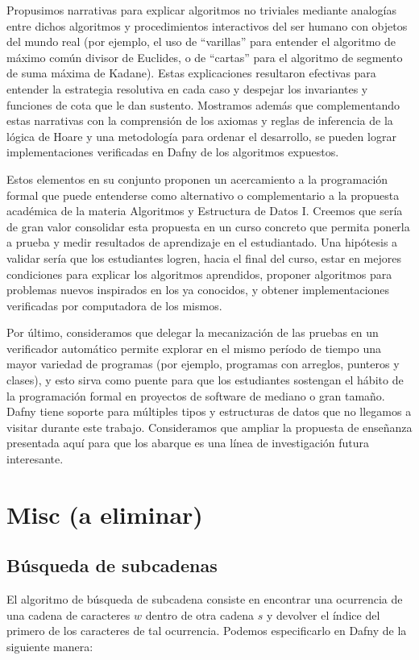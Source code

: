 \documentclass[12pt, a4paper, openany, fleqn]{book}
\begin{document}
    Propusimos narrativas para explicar algoritmos no triviales mediante analogías entre dichos algoritmos y procedimientos interactivos del ser humano con objetos del mundo real (por ejemplo, el uso de ``varillas'' para entender el algoritmo de máximo común divisor de Euclides, o de ``cartas'' para el algoritmo de segmento de suma máxima de Kadane). Estas explicaciones resultaron efectivas para entender la estrategia resolutiva en cada caso y despejar los invariantes y funciones de cota que le dan sustento. Mostramos además que complementando estas narrativas con la comprensión de los axiomas y reglas de inferencia de la lógica de Hoare y una metodología para ordenar el desarrollo, se pueden lograr implementaciones verificadas en Dafny de los algoritmos expuestos.

    Estos elementos en su conjunto proponen un acercamiento a la programación formal que puede entenderse como alternativo o complementario a la propuesta académica de la materia Algoritmos y Estructura de Datos I. Creemos que sería de gran valor consolidar esta propuesta en un curso concreto que permita ponerla a prueba y medir resultados de aprendizaje en el estudiantado. Una hipótesis a validar sería que los estudiantes logren, hacia el final del curso, estar en mejores condiciones para explicar los algoritmos aprendidos, proponer algoritmos para problemas nuevos inspirados en los ya conocidos, y obtener implementaciones verificadas por computadora de los mismos.

    Por último, consideramos que delegar la mecanización de las pruebas en un verificador automático permite explorar en el mismo período de tiempo una mayor variedad de programas (por ejemplo, programas con arreglos, punteros y clases), y esto sirva como puente para que los estudiantes sostengan el hábito de la programación formal en proyectos de software de mediano o gran tamaño. Dafny tiene soporte para múltiples tipos y estructuras de datos que no llegamos a visitar durante este trabajo. Consideramos que ampliar la propuesta de enseñanza presentada aquí para que los abarque es una línea de investigación futura interesante.

    \chapter{Misc (a eliminar)}

    \section{Búsqueda de subcadenas}
    El algoritmo de búsqueda de subcadena consiste en encontrar una ocurrencia de una cadena de caracteres $w$ dentro de otra cadena $s$ y devolver el índice del primero de los caracteres de tal ocurrencia. Podemos especificarlo en Dafny de la siguiente manera:
\end{document}
